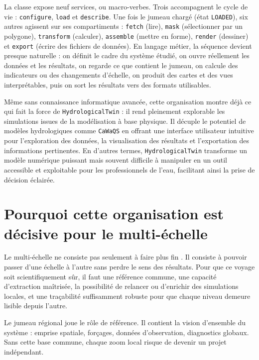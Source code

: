 \documentclass[11pt,a4paper]{article}
\newcommand{\hydrot}{\texttt{HydrologicalTwin}}
\newcommand{\caw}{\texttt{CaWaQS}}
\begin{document}
La classe expose neuf services, ou macro-verbes. Trois accompagnent le cycle de vie : \texttt{configure}, \texttt{load} et \texttt{describe}. Une fois le jumeau chargé (état \texttt{LOADED}), six autres agissent sur ses compartiments : \texttt{fetch} (lire), \texttt{mask} (sélectionner par un polygone), \texttt{transform} (calculer), \texttt{assemble} (mettre en forme), \texttt{render} (dessiner) et \texttt{export} (écrire des fichiers de données). En langage métier, la séquence devient presque naturelle : on définit le cadre du système étudié, on ouvre réellement les données et les résultats, on regarde ce que contient le jumeau, on calcule des indicateurs ou des changements d'échelle, on produit des cartes et des vues interprétables, puis on sort les résultats vers des formats utilisables.

Même sans connaissance informatique avancée, cette organisation montre déjà ce qui fait la force de \hydrot{} : il rend pleinement explorable les simulations issues de la modélisation à base physique. Il décuple le potentiel de modèles hydrologiques comme \caw{} en offrant une interface utilisateur intuitive pour l'exploration des données, la visualisation des résultats et l'exportation des informations pertinentes. En d'autres termes, \hydrot{} transforme un modèle numérique puissant mais souvent difficile à manipuler en un outil accessible et exploitable pour les professionnels de l'eau, facilitant ainsi la prise de décision éclairée.

\section{Pourquoi cette organisation est décisive pour le multi-échelle}

Le multi-échelle ne consiste pas seulement à faire \og plus fin \fg{}. Il consiste à pouvoir passer d'une échelle à l'autre sans perdre le sens des résultats. Pour que ce voyage soit scientifiquement sûr, il faut une référence commune, une capacité d'extraction maîtrisée, la possibilité de relancer ou d'enrichir des simulations locales, et une traçabilité suffisamment robuste pour que chaque niveau demeure lisible depuis l'autre.


Le jumeau régional joue le rôle de référence. Il contient la vision d'ensemble du système : emprise spatiale, forçages, données d'observation, diagnostics globaux. Sans cette base commune, chaque zoom local risque de devenir un projet indépendant.
\end{document}

